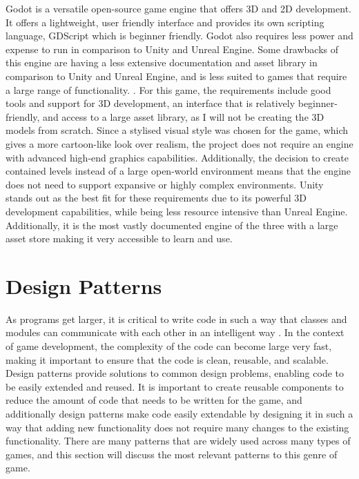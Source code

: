 \documentclass[10pt]{final_report}
\begin{document}
\newline
Godot is a versatile open-source game engine that offers 3D and 2D development. It offers a lightweight, user friendly interface and provides its own scripting language, GDScript which is beginner friendly. Godot also requires less power and expense to run in comparison to Unity and Unreal Engine. Some drawbacks of this engine are having a less extensive documentation and asset library in comparison to Unity and Unreal Engine, and is less suited to games that require a large range of functionality. \cite{hatton_2024}. \newline
For this game, the requirements include good tools and support for 3D development, an interface that is relatively beginner-friendly, and access to a large asset library, as I will not be creating the 3D models from scratch. Since a stylised visual style was chosen for the game, which gives a more cartoon-like look over realism, the project does not require an engine with advanced high-end graphics capabilities. Additionally, the decision to create contained levels instead of a large open-world environment means that the engine does not need to support expansive or highly complex environments.
Unity stands out as the best fit for these requirements due to its powerful 3D development capabilities, while being less resource intensive than Unreal Engine. Additionally, it is the most vastly documented engine of the three with a large asset store making it very accessible to learn and use.


\section{Design Patterns}
As programs get larger, it is critical to write code in such a way that classes and modules can communicate with each other in an intelligent way \cite{Doran2017}. In the context of game development, the complexity of the code can become large very fast, making it important to ensure that the code is clean, reusable, and scalable. Design patterns provide solutions to common design problems, enabling code to be easily extended and reused. It is important to create reusable components to reduce the amount of code that needs to be written for the game, and additionally design patterns make code easily extendable by designing it in such a way that adding new functionality does not require many changes to the existing functionality. There are many patterns that are widely used across many types of games, and this section will discuss the most relevant patterns to this genre of game.
\end{document}
